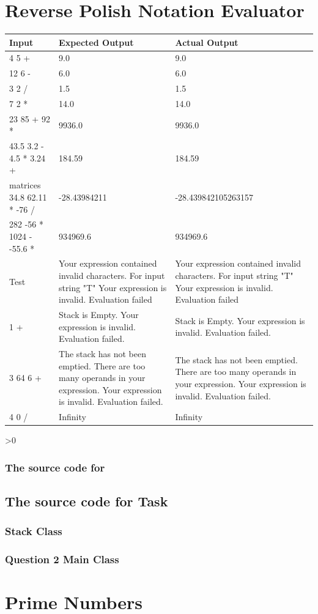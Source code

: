 \documentclass[12pt,a4paper,onesided]{report}
\newcommand{\source}{\pagebreak
	\ifnum\value{section}>0
		\subsection{The source code for \thesection}

	\else
		\section{The source code for Task \thechapter}

	\fi
	}
\begin{document}
\chapter{Reverse Polish Notation Evaluator}
\begin{table}[h!]
	\centering
\begin{tabular}{lp{28ex}p{28ex}}
	\toprule Input & Expected Output & Actual Output\\
	\midrule
	4 5 + & 9.0 & 9.0\\
	12 6 - & 6.0 & 6.0\\
	3 2 / & 1.5 & 1.5 \\
	7 2 * & 14.0 & 14.0\\
	23 85 + 92 * & 9936.0 & 9936.0 \\
	43.5 3.2 - 4.5 * 3.24 + & 184.59 & 184.59 \\matrices
	34.8 62.11 * -76 / & -28.43984211 & -28.439842105263157\\
	282 -56 * 1024 - -55.6 * & 934969.6 & 934969.6\\
	Test & Your expression contained invalid characters. For input string "T" Your expression is invalid. Evaluation failed& Your expression contained invalid characters. For input string "T" Your expression is invalid. Evaluation failed\\ 
	1 + & Stack is Empty. Your expression is invalid. Evaluation failed. &  Stack is Empty. Your expression is invalid. Evaluation failed.\\
	3 64 6 + & The stack has not been emptied. There are too many operands in your expression. Your expression is invalid. Evaluation failed. & The stack has not been emptied. There are too many operands in your expression. Your expression is invalid. Evaluation failed. \\
	4 0 / & Infinity & Infinity \\
	\bottomrule
\end{tabular}
\end{table}
\source
\subsection{Stack Class}

\subsection{Question 2 Main Class}

\chapter{Prime Numbers}
\end{document}
